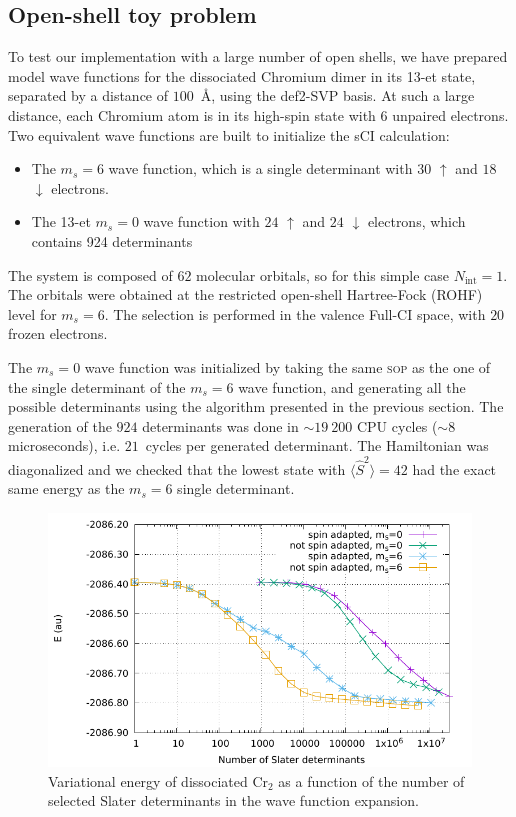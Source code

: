 \documentclass[aip,jcp,reprint,showkeys]{revtex4-1}
\newcommand{\stwo}{\hat{S}^2}
\newcommand{\up}{\uparrow}
\newcommand{\dn}{\downarrow}
\newcommand{\Nint}{{N_\text{int}}}
\newcommand{\sop}{\textsc{sop}}
\begin{document}
\subsection{Open-shell toy problem}

To test our implementation with a large number of open shells, we have prepared
model wave functions for the dissociated Chromium dimer in its 13-et state, separated by a
distance of $100$~\AA, using the def2-SVP basis.\cite{Weigend_2005}
At such a large distance, each Chromium atom is in its high-spin state with $6$
unpaired electrons. Two equivalent wave functions are built to initialize the sCI
calculation:
\begin{itemize}
\item The $m_s=6$ wave function, which is a single determinant with $30$ $\up$
      and $18$ $\dn$ electrons.
\item The 13-et $m_s=0$ wave function with $24$ $\up$ and $24$ $\dn$ electrons, which
      contains 924 determinants
\end{itemize}
The system is composed of $62$ molecular orbitals, so for this simple case $\Nint=1$.
The orbitals were obtained at the restricted open-shell Hartree-Fock (ROHF) level
for $m_s=6$.
The selection is performed in the valence Full-CI space, with $20$ frozen electrons.

The $m_s=0$ wave function was initialized by taking the same {\sop} as the
one of the single determinant of the $m_s=6$ wave function, and generating all
the possible determinants using the algorithm presented in the previous
section.  The generation of the $924$ determinants was done in $\sim 19~200$
CPU cycles ($\sim8$ microseconds), i.e.  $21$~cycles per generated determinant. The Hamiltonian was
diagonalized and we checked that the lowest state with $\langle \stwo \rangle =
42$ had the exact same energy as the $m_s=6$ single determinant.

\begin{figure}
\includegraphics[width=0.9\columnwidth]{e_var_ndet}
\caption{Variational energy of dissociated Cr$_2$ as a function of the number of
selected Slater determinants in the wave function expansion.}
\label{fig:e_var_ndet}
\end{figure}
\end{document}
